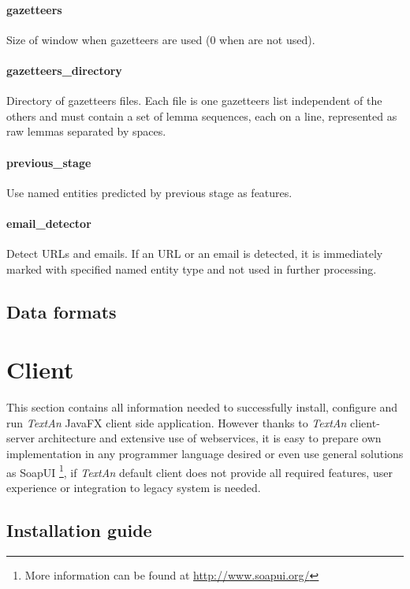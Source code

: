 \documentclass[12pt,a4paper]{report}
\newcommand{\textan}{\emph{TextAn}}
\begin{document}
\paragraph{gazetteers}
Size of window when gazetteers are used (0 when are not used).

\paragraph{gazetteers\_directory}
Directory of gazetteers files. Each file is one gazetteers list independent
of the others and must contain a set of lemma sequences, each on a line,
represented as raw lemmas separated by spaces.

\paragraph{previous\_stage}
Use named entities predicted by previous stage as features.

\paragraph{email\_detector}
Detect URLs and emails. If an URL or an email is detected, it is immediately marked
with specified named entity type and not used in further processing.

\subsection{Data formats}

\section{Client}

This section contains all information needed to successfully install, configure
and run \textan{} JavaFX client side application. However thanks to \textan{}
client-server architecture and extensive use of webservices, it is easy to
prepare own implementation in any programmer language desired or even use
general solutions as SoapUI%
\footnote{More information can be found at \url{http://www.soapui.org/}},
if \textan{} default client does not provide all required features, user
experience or integration to legacy system is needed.

\subsection{Installation guide}
\end{document}
